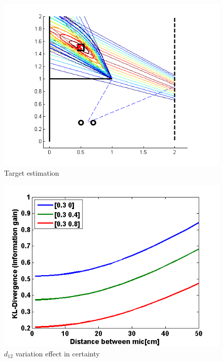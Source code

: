 \documentclass[letterpaper, 10 pt, conference]{ieeeconf}  %
\begin{document}
\begin{figure}[thpb]
  \centering
  \includegraphics[width=\columnwidth]{Figures/estimation.png} %
  \caption{Target estimation}
  \label{fig:localization}
\end{figure}

\begin{figure}[thpb]
	\centering
	\includegraphics[width=0.7\columnwidth]{Figures/sensor_param.png} %
	\caption{$d_{12}$ variation effect in certainty}
	\label{fig:mic_param}
\end{figure}
\end{document}
